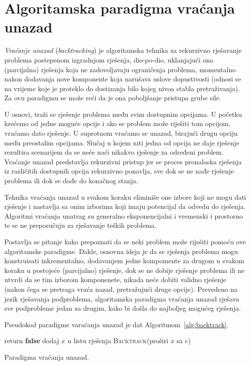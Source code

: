 \section{Algoritamska paradigma vraćanja unazad }

  \textit{Vraćanje unazad} (\textit{backtracking}) je algoritamska tehnika za rekurzivno rješavanje problema postepenom izgradnjom  rješenja, dio-po-dio, uklanjajući ona (parcijalna) rješenja koja ne zadovoljavaju ograničenja problema, momentalno nakon dodavanja nove komponente koja narušava uslove dopustivosti (odnosi se na vrijeme koje je proteklo do dostizanja bilo kojeg nivoa stabla pretraživanja). Za ovu paradigmu se može reći da je ona  poboljšanje pristupa grube sile.
  
  U osnovi,   traži  se  rješenje problema među svim dostupnim opcijama. U početku krećemo od jedne moguće opcije i ako se problem može riješiti tom opcijom, vraćamo dato rješenje. U suprotnom vraćamo se unazad, birajući drugu opciju među preostalim   opcijama. Slučaj u kojem  niti jedna od opcija ne daje rješenje rezultira scenarijem da se neće naći nikakvo rješenje za  određeni problem.  Vraćanje unazad predstavlja rekurzivni pristup jer se proces pronalaska rješenja iz različitih dostupnih opcija rekurzivno ponavlja, sve dok se ne nađe rješenje problema ili dok se dođe do konačnog stanja.
  
  
   Tehnika vraćanja unazad u svakom koraku eliminiše one izbore koji ne mogu dati rješenje i nastavlja   sa onim izborima koji imaju potencijal da odvedu do rješenja. Algoritmi vraćanja unatrag su generalno eksponencijalni i  vremenski i prostorno te se ne preporučuju za rješavanje teških problema.  
    
    Postavlja se pitanje kako prepoznati da se neki problem može riješiti pomoću ove algoritamske paradigme. Dakle, osnovna ideja je da se rješenja problema mogu konstruisati inkrementalno, dodavanjem jedne kompomente za drugom u svakom koraku u postojeće (parcijalno) rješenje, dok se ne dobije rješenje problema ili ne utvrdi da se tim izborom komponenete, nikada neće dobiti validno rješenje (nakon čega se pretraga vraća nazad, pretražujući druge opcije). Prevedeno na jezik rješavanja podproblema, algoritamska paradigma vraćanja unazad rješava sve podprobleme jedan za drugim, kako bi  došla do najboljeg mogućeg rješenja. 
    
    Pseudokod paradigme varaćanja unazad je dat Algoritmom~\ref{alg:backtrack}. 
    
    \begin{algorithm}
    	\begin{algorithmic}[1]
    		        \State return \textbf{false}
    		   \EndIf
    		     \State dodaj $x$ u listu rješenja
    		  \EndIf
    		      \State \textsc{Backtrack}(proširi $x$ sa $e$)
    		  \EndFor
    		\EndProcedure
    	\end{algorithmic}

        \caption{Paradigma vraćanja unazad. }        \label{alg:backtrack}
    \end{algorithm}
    
